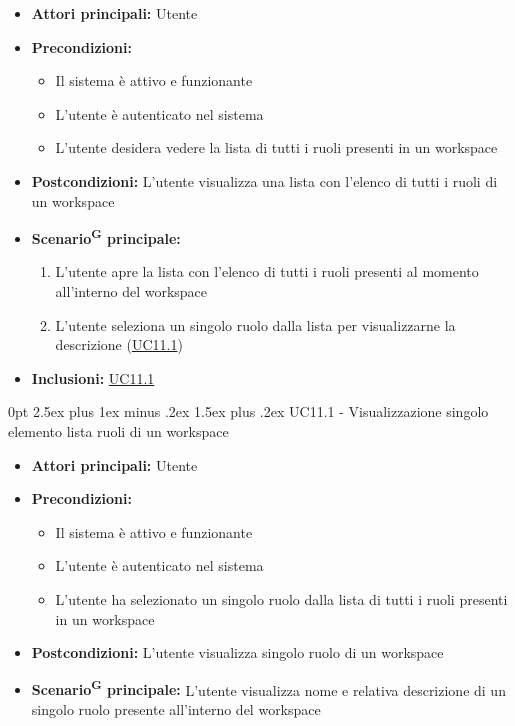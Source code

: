 \documentclass[a4paper, 11pt]{article}
\makeatletter
\renewcommand\paragraph{\@startsection{paragraph}{4}
  {0pt}
  {2.5ex plus 1ex minus .2ex}
  {1.5ex plus .2ex}
  {\normalfont\normalsize\bfseries\color{AccentDark}}}
\makeatother
\begin{document}
\begin{itemize}
	\item \textbf{Attori principali:} Utente
	\item \textbf{Precondizioni:}
	\begin{itemize}
		\item Il sistema è attivo e funzionante
		\item L'utente è autenticato nel sistema
        \item L'utente desidera vedere la lista di tutti i ruoli presenti in un workspace
	\end{itemize}
    \item \textbf{Postcondizioni:} L'utente visualizza una lista con l'elenco di tutti i ruoli di un workspace
	\item \textbf{Scenario\textsuperscript{G} principale:}
	\begin{enumerate}
        \item L'utente apre la lista con l'elenco di tutti i ruoli presenti al momento all'interno del workspace
        \item L'utente seleziona un singolo ruolo dalla lista per visualizzarne la descrizione (\hyperref[UC11.1]{UC11.1})
	\end{enumerate}
    \item \textbf{Inclusioni:} \hyperref[UC11.1]{UC11.1}
\end{itemize}

\paragraph{UC11.1 - Visualizzazione singolo elemento lista ruoli di un workspace}\label{UC11.1}
\begin{itemize}
	\item \textbf{Attori principali:} Utente
	\item \textbf{Precondizioni:}
	\begin{itemize}
		\item Il sistema è attivo e funzionante
		\item L'utente è autenticato nel sistema
        \item L'utente ha selezionato un singolo ruolo dalla lista di tutti i ruoli presenti in un workspace
	\end{itemize}
    \item \textbf{Postcondizioni:} L'utente visualizza singolo ruolo di un workspace
	\item \textbf{Scenario\textsuperscript{G} principale:} L'utente visualizza nome e relativa descrizione di un singolo ruolo presente all'interno del workspace
\end{itemize}
\end{document}
